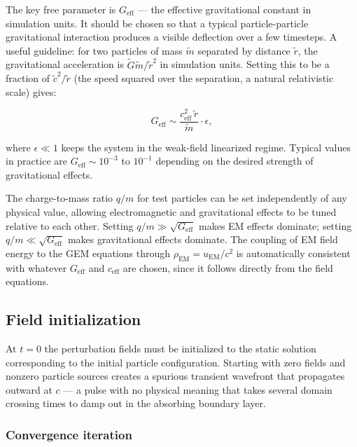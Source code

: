 \documentclass[11pt,a4paper]{article}
\begin{document}
The key free parameter is $G_{\mathrm{eff}}$ — the effective gravitational constant in simulation units.  It should be chosen so that a typical particle-particle gravitational interaction produces a visible deflection over a few timesteps.  A useful guideline: for two particles of mass $\tilde{m}$ separated by distance $\tilde{r}$, the gravitational acceleration is $\tilde{G}\tilde{m}/\tilde{r}^2$ in simulation units.  Setting this to be a fraction of $\tilde{c}^2/\tilde{r}$ (the speed squared over the separation, a natural relativistic scale) gives:

\begin{equation}
  G_{\mathrm{eff}} \sim \frac{c_{\mathrm{eff}}^2\,\tilde{r}}{\tilde{m}} \cdot \epsilon,
\end{equation}

where $\epsilon \ll 1$ keeps the system in the weak-field linearized regime.  Typical values in practice are $G_{\mathrm{eff}} \sim 10^{-3}$ to $10^{-1}$ depending on the desired strength of gravitational effects.

The charge-to-mass ratio $q/m$ for test particles can be set independently of any physical value, allowing electromagnetic and gravitational effects to be tuned relative to each other.  Setting $q/m \gg \sqrt{G_{\mathrm{eff}}}$ makes EM effects dominate; setting $q/m \ll \sqrt{G_{\mathrm{eff}}}$ makes gravitational effects dominate.  The coupling of EM field energy to the GEM equations through $\rho_{\mathrm{EM}} = u_{\mathrm{EM}}/c^2$ is automatically consistent with whatever $G_{\mathrm{eff}}$ and $c_{\mathrm{eff}}$ are chosen, since it follows directly from the field equations.

\subsection{Field initialization}
\label{sec:init}

At $t=0$ the perturbation fields must be initialized to the static solution corresponding to the initial particle configuration.  Starting with zero fields and nonzero particle sources creates a spurious transient wavefront that propagates outward at $c$ --- a pulse with no physical meaning that takes several domain crossing times to damp out in the absorbing boundary layer.

\subsubsection*{Convergence iteration}
\end{document}
